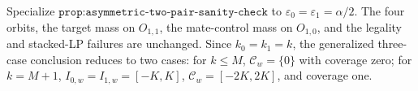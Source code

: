 Specialize \(\texttt{prop:asymmetric-two-pair-sanity-check}\) to \(\varepsilon_0=\varepsilon_1=\alpha/2\). The four orbits, the target mass on \(O_{1,1}\), the mate-control mass on \(O_{1,0}\), and the legality and stacked-LP failures are unchanged. Since \(k_0=k_1=k\), the generalized three-case conclusion reduces to two cases: for \(k\le M\), \(\mathcal C_w=\{0\}\) with coverage zero; for \(k=M+1\), \(I_{0,w}=I_{1,w}=[-K,K]\), \(\mathcal C_w=[-2K,2K]\), and coverage one.